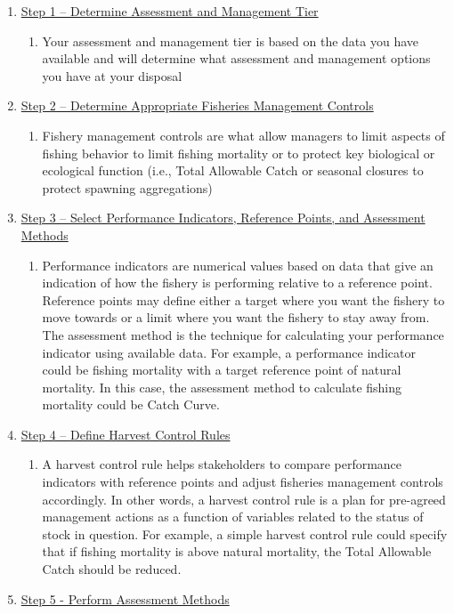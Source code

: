 \documentclass[]{book}
\providecommand{\tightlist}{%
  \setlength{\itemsep}{0pt}\setlength{\parskip}{0pt}}
\begin{document}
\begin{enumerate}
\def\labelenumi{\arabic{enumi}.}
\item
  \protect\hyperlink{Step1}{Step 1 -- Determine Assessment and
  Management Tier}

  \begin{enumerate}
  \def\labelenumii{\alph{enumii}.}
  \tightlist
  \item
    Your assessment and management tier is based on the data you have
    available and will determine what assessment and management options
    you have at your disposal
  \end{enumerate}
\item
  \protect\hyperlink{Step2}{Step 2 -- Determine Appropriate Fisheries
  Management Controls}

  \begin{enumerate}
  \def\labelenumii{\alph{enumii}.}
  \tightlist
  \item
    Fishery management controls are what allow managers to limit aspects
    of fishing behavior to limit fishing mortality or to protect key
    biological or ecological function (i.e., Total Allowable Catch or
    seasonal closures to protect spawning aggregations)
  \end{enumerate}
\item
  \protect\hyperlink{Step3}{Step 3 -- Select Performance Indicators,
  Reference Points, and Assessment Methods}

  \begin{enumerate}
  \def\labelenumii{\alph{enumii}.}
  \tightlist
  \item
    Performance indicators are numerical values based on data that give
    an indication of how the fishery is performing relative to a
    reference point. Reference points may define either a target where
    you want the fishery to move towards or a limit where you want the
    fishery to stay away from. The assessment method is the technique
    for calculating your performance indicator using available data. For
    example, a performance indicator could be fishing mortality with a
    target reference point of natural mortality. In this case, the
    assessment method to calculate fishing mortality could be Catch
    Curve.
  \end{enumerate}
\item
  \protect\hyperlink{Step4}{Step 4 -- Define Harvest Control Rules}

  \begin{enumerate}
  \def\labelenumii{\alph{enumii}.}
  \tightlist
  \item
    A harvest control rule helps stakeholders to compare performance
    indicators with reference points and adjust fisheries management
    controls accordingly. In other words, a harvest control rule is a
    plan for pre-agreed management actions as a function of variables
    related to the status of stock in question. For example, a simple
    harvest control rule could specify that if fishing mortality is
    above natural mortality, the Total Allowable Catch should be
    reduced.
  \end{enumerate}
\item
  \protect\hyperlink{Step5}{Step 5 - Perform Assessment Methods}


\end{enumerate}
\end{document}
